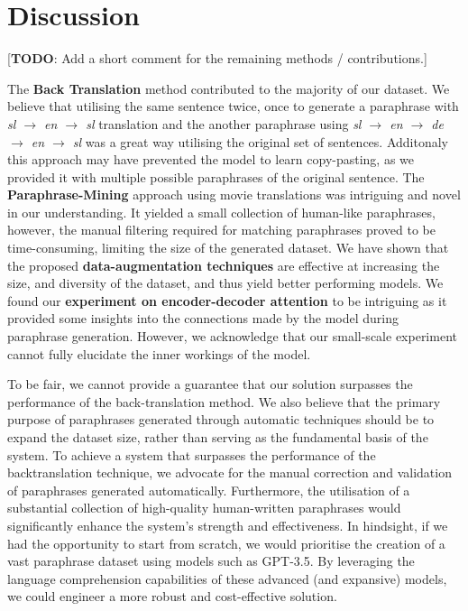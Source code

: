 \documentclass[fleqn,moreauthors,10pt]{ds_report}
\begin{document}

\section*{Discussion}

[\textbf{TODO}: Add a short comment for the remaining methods / contributions.]

The \textbf{Back Translation} method contributed to the majority of our dataset. We believe that utilising the same sentence twice, once to generate a paraphrase with \textit{sl $\rightarrow$ en $\rightarrow$ sl}  translation and the another paraphrase using \textit{sl $\rightarrow$ en $\rightarrow$ de $\rightarrow$ en $\rightarrow$ sl}  was a great way utilising the original set of sentences. Additonaly this approach may have prevented the model to learn copy-pasting, as we provided it with multiple possible paraphrases of the original sentence. The \textbf{Paraphrase-Mining} approach using movie translations was intriguing and novel in our understanding. It yielded a small collection of human-like paraphrases, however, the manual filtering required for matching paraphrases proved to be time-consuming, limiting the size of the generated dataset. We have shown that the proposed \textbf{data-augmentation techniques} are effective at increasing the size, and diversity of the dataset, and thus yield better performing models. We found our \textbf{experiment on encoder-decoder attention} to be intriguing as it provided some insights into the connections made by the model during paraphrase generation. However, we acknowledge that our small-scale experiment cannot fully elucidate the inner workings of the model. 

To be fair, we cannot provide a guarantee that our solution surpasses the performance of the back-translation method. We also believe that the primary purpose of paraphrases generated through automatic techniques should be to expand the dataset size, rather than serving as the fundamental basis of the system. To achieve a system that surpasses the performance of the backtranslation technique, we advocate for the manual correction and validation of paraphrases generated automatically. Furthermore, the utilisation of a substantial collection of high-quality human-written paraphrases would significantly enhance the system's strength and effectiveness. In hindsight, if we had the opportunity to start from scratch, we would prioritise the creation of a vast paraphrase dataset using models such as GPT-3.5. By leveraging the language comprehension capabilities of these advanced (and expansive) models, we could engineer a more robust and cost-effective solution.
\end{document}
